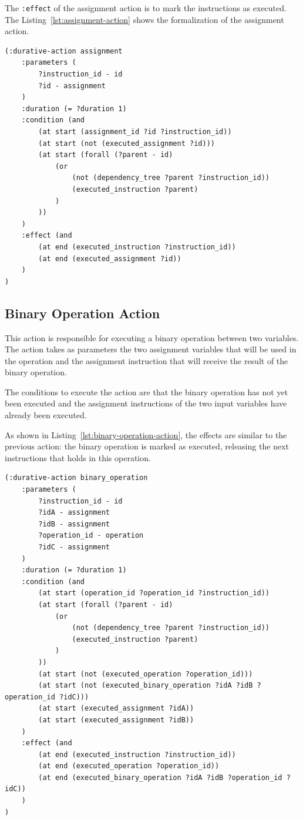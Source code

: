 \documentclass[letterpaper]{article}
\begin{document}
The \texttt{:effect} of the assignment action is to mark the instructions as executed. The Listing~\ref{lst:assignment-action} shows the formalization of the assignment action.

\begin{lstlisting}[caption=Formalization of the assignment action,label=lst:assignment-action,style=pddlStyle]
(:durative-action assignment
    :parameters (
        ?instruction_id - id
        ?id - assignment
    )
    :duration (= ?duration 1)
    :condition (and
        (at start (assignment_id ?id ?instruction_id))
        (at start (not (executed_assignment ?id)))
        (at start (forall (?parent - id)
            (or
                (not (dependency_tree ?parent ?instruction_id))
                (executed_instruction ?parent)
            )
        ))
    )
    :effect (and
        (at end (executed_instruction ?instruction_id))
        (at end (executed_assignment ?id))
    )
)
\end{lstlisting}

\subsection{Binary Operation Action}

This action is responsible for executing a binary operation between two variables. The action takes as parameters the two assignment variables that will be used in the operation and the assignment instruction that will receive the result of the binary operation.

The conditions to execute the action are that the binary operation has not yet been executed and the assignment instructions of the two input variables have already been executed.

As shown in Listing~\ref{lst:binary-operation-action}, the effects are similar to the previous action: the binary operation is marked as executed, releasing the next instructions that holds in this operation.

\begin{lstlisting}[caption=Formalization of the binary operation action,label=lst:binary-operation-action,style=pddlStyle]
(:durative-action binary_operation
    :parameters (
        ?instruction_id - id
        ?idA - assignment
        ?idB - assignment
        ?operation_id - operation
        ?idC - assignment
    )
    :duration (= ?duration 1)
    :condition (and
        (at start (operation_id ?operation_id ?instruction_id))
        (at start (forall (?parent - id)
            (or
                (not (dependency_tree ?parent ?instruction_id))
                (executed_instruction ?parent)
            )
        ))
        (at start (not (executed_operation ?operation_id)))
        (at start (not (executed_binary_operation ?idA ?idB ?operation_id ?idC)))
        (at start (executed_assignment ?idA))
        (at start (executed_assignment ?idB))
    )
    :effect (and
        (at end (executed_instruction ?instruction_id))
        (at end (executed_operation ?operation_id))
        (at end (executed_binary_operation ?idA ?idB ?operation_id ?idC))
    )
)
\end{lstlisting}
\end{document}
